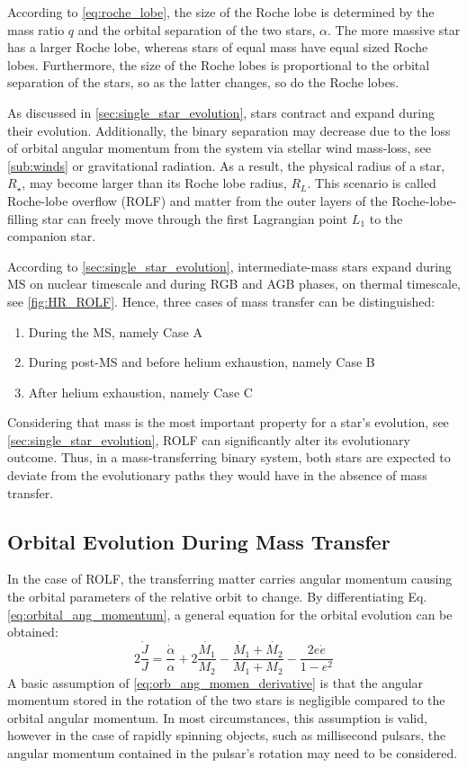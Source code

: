 According to \eqref{eq:roche_lobe}, the size of the Roche lobe is determined by the mass ratio $q$ and the orbital separation of the two stars, $\alpha$. The more massive star has a larger Roche lobe, whereas stars of equal mass have equal sized Roche lobes. Furthermore, the size of the Roche lobes is proportional to the orbital separation of the stars, so as the latter changes, so do the Roche lobes.

As discussed in \cref{sec:single_star_evolution}, stars contract and expand during their evolution. Additionally, the binary separation may decrease due to the loss of orbital angular momentum from the system via stellar wind mass-loss, see \cref{sub:winds} or gravitational radiation. As a result, the physical radius of a star, $R_{\star}$, may become larger than its Roche lobe radius, $R_L$. This scenario is called Roche-lobe overflow (ROLF) and matter from the outer layers of the Roche-lobe-filling star can freely move through the first Lagrangian point $L_1$ to the companion star. 

According to \cref{sec:single_star_evolution}, intermediate-mass stars expand during MS on nuclear timescale and during RGB and AGB phases, on thermal timescale, see \cref{fig:HR_ROLF}.  Hence, three cases of mass transfer can be distinguished:
\begin{enumerate}
    \item During the MS, namely Case A
    \item During post-MS and before helium exhaustion, namely Case B
    \item After helium exhaustion, namely Case C
\end{enumerate}
Considering that mass is the most important property for a star's evolution, see \cref{sec:single_star_evolution}, ROLF can significantly alter its evolutionary outcome. Thus, in a mass-transferring binary system, both stars are expected to deviate from the evolutionary paths they would have in the absence of mass transfer. 

\subsection{Orbital Evolution During Mass Transfer}

In the case of ROLF, the transferring matter carries angular momentum causing the orbital parameters of the relative orbit to change. By differentiating Eq. \eqref{eq:orbital_ang_momentum}, a general equation for the orbital evolution can be obtained:
\begin{equation}\label{eq:orb_ang_momen_derivative}
    2\frac{\dot{J}}{J} = \frac{\dot{\alpha}}{\alpha} + 2 \frac{\dot{M_1}}{M_2} - \frac{ \dot{M_1} + \dot{M_2}}{M_1 + M_2} - \frac{2e \dot{e}}{1-e^2} 
\end{equation}
A basic assumption of \eqref{eq:orb_ang_momen_derivative} is that the angular momentum stored in the rotation of the two stars is negligible compared to the orbital angular momentum. In most circumstances, this assumption is valid, however in the case of rapidly spinning objects, such as millisecond pulsars, the angular momentum contained in the pulsar's rotation may need to be considered.  

